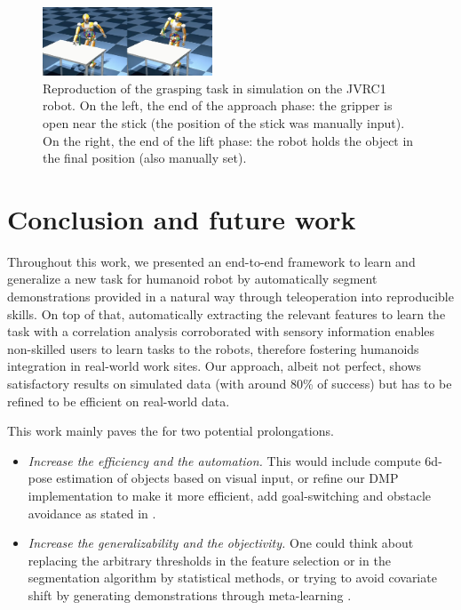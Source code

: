 \documentclass[a4paper, 10pt, conference]{ieeeconf}
\begin{document}
\begin{figure}[t]
  \centering
  \includegraphics[width=0.45\textwidth]{img/Reproduction.png}
  \caption{Reproduction of the grasping task in simulation on the JVRC1 robot. On the left, the end of the approach phase: the gripper is open near the stick (the position of the stick was manually input). On the right, the end of the lift phase: the robot holds the object in the final position (also manually set).}
  \label{fig:reproductionSim}
\end{figure}

\section{Conclusion and future work}\label{conclusion}

Throughout this work, we presented an end-to-end framework to learn and generalize a new task for humanoid robot by automatically segment demonstrations provided in a natural way through teleoperation into reproducible skills. 
On top of that, automatically extracting the relevant features to learn the task with a correlation analysis corroborated with sensory information enables non-skilled users to learn tasks to the robots, therefore fostering humanoids integration in real-world work sites. Our approach, albeit not perfect, shows satisfactory results on simulated data (with around 80\% of success) but has to be refined to be efficient on real-world data. \newline


This work mainly paves the for two potential prolongations.
\begin{itemize}
    \item \textit{Increase the efficiency and the automation.} This would include compute 6d-pose estimation of objects based on visual input, or refine our DMP implementation to make it more efficient, add goal-switching and obstacle avoidance as stated in \cite{saveriano_dynamic_2021}. 
    
    \item  \textit{Increase the generalizability and the objectivity.} One could think about replacing the arbitrary thresholds in the feature selection or in the segmentation algorithm by statistical methods, or trying to avoid covariate shift by generating demonstrations through meta-learning \cite{yu_one-shot_2018}.

\end{itemize}




\vspace{12pt}
\end{document}
